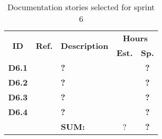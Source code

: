  \def\arraystretch{1.25}
 
\begin{longtable}{ccXcc}
  \label{tab:sprint6Documentationstories}\\[-6mm]
\caption{Documentation stories selected for sprint 6}\\[-4mm]

\toprule[0.5mm]
\multirow{2}{*}{\textbf{ID}} &
\multirow{2}{*}{\textbf{Ref.}} & \multirow{2}{*}{\textbf{Description}} & \multicolumn{2}{c}{\textbf{Hours}} \\
 					& & & \textbf{Est.} & \textbf{Sp.} \\
\midrule

\textbf{D6.1} 	& & {\bf ?} 		&   & \textbf{?} \\
	
\textbf{D6.2} 	& & {\bf ?} 		& 	& \textbf{?} \\

\textbf{D6.3} 	& & {\bf ?} 		& 	& \textbf{?} \\

\textbf{D6.4} 	&& {\bf ?} 			& 	& \textbf{?} \\


\midrule
		
				&& \textbf{SUM:}		&	?	& \textbf{?}
 \\																			
\bottomrule[0.5mm]
\end{longtable}
